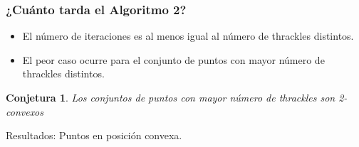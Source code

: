 \documentclass{beamer}
\newtheorem{conj}{Conjetura}
\begin{document}
\begin{frame}
  \frametitle{¿Cuánto tarda el Algoritmo 2?}
  \begin{overprint}
    \begin{itemize}
      \item El número de iteraciones es al menos igual al número de thrackles
        distintos.
      \item El peor caso ocurre para el conjunto de puntos con mayor número de
        thrackles distintos.
    \end{itemize}
    \begin{conj}
      Los conjuntos de puntos con mayor número de thrackles son 2-convexos
    \end{conj}
  \end{overprint}
  \vspace{0.2cm}
  \begin{figure}[htb]
    \centering
    \def\svgwidth{10cm}
    
  \end{figure}
\end{frame}

\begin{frame}[c]
  \begin{center}
    \Huge Resultados: Puntos en posición convexa.
  \end{center}
\end{frame}
\end{document}
